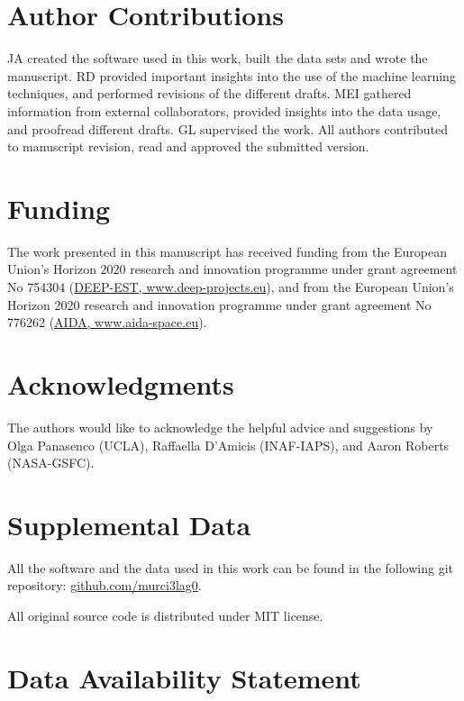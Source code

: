 \documentclass[utf8]{frontiersSCNS} %
\begin{document}
\section*{Author Contributions}

JA created the software used in this work, built the data sets and wrote the manuscript. RD provided important insights into the use of the machine learning techniques, and performed revisions of the different drafts. MEI gathered information from external collaborators, provided insights into the data usage, and proofread different drafts. GL supervised the work. All authors contributed to manuscript revision, read and approved the submitted version.

\section*{Funding}

The work presented in this manuscript has received funding from the European Union’s Horizon 2020 research and innovation programme under grant agreement No 754304 (\href{https://www.deep-projects.eu}{DEEP-EST, www.deep-projects.eu}), and from the European Union’s Horizon 2020 research and innovation programme under grant agreement No 776262 (\href{https://www.aida-space.eu}{AIDA, www.aida-space.eu}).

\section*{Acknowledgments}

The authors would like to acknowledge the helpful advice and suggestions by Olga Panasenco (UCLA), Raffaella D'Amicis (INAF-IAPS), and Aaron Roberts (NASA-GSFC).

\section*{Supplemental Data}

All the software and the data used in this work can be found in the following git repository: \href{http://github.com/murci3lag0}{github.com/murci3lag0}.

All original source code is distributed under MIT license.

\section*{Data Availability Statement}
\label{sec:repos}
\end{document}
